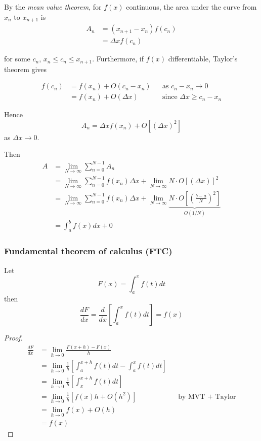 \documentclass{../../template/note}
\begin{document}
    

    By the \emph{mean value theorem}, for \(f(x)\) continuous, the area under the curve from \(x_n\) to \(x_{n+1}\) is
    \begin{align*}
        A_n &= (x_{n+1}-x_n)f(c_n) \\
        &= \Delta x f(c_n)
    \end{align*}
    
    for some \(c_n\), \(x_n \leq c_n \leq x_{n+1}\). Furthermore, if \(f(x)\) differentiable, Taylor's theorem gives

    \begin{align*}
        f(c_n) &= f(x_n) + O(c_n-x_n) && \text{as } c_n - x_n \to 0 \\
        &= f(x_n) + O(\Delta x) && \text{since } \Delta x \geq c_n - x_n
    \end{align*}
    
    Hence
    \[
        A_n = \Delta x f(x_n) + O[(\Delta x)^2]
    \]
    as \(\Delta x \to 0\).
    
    Then
    \begin{align*}
        A &= \lim_{N \to \infty} \sum_{n=0}^{N-1} A_n \\
        &= \lim_{N \to \infty} \sum_{n=0}^{N-1} f(x_n) \Delta x + \lim_{N \to \infty} N \cdot O[(\Delta x)]^2 \\
        &= \lim_{N \to \infty} \sum_{n=0}^{N-1} f(x_n) \Delta x + \lim_{N \to \infty}  \underbrace{N \cdot O\left[\left(\frac{b-a}{N}\right)^2\right]}_{O(1/N)} \\
        &= \int_a^b f(x) dx + 0
    \end{align*}
    
    \subsubsection{Fundamental theorem of calculus (FTC)}
    
    \begin{theorem}[FTC]
        Let
        \[
            F(x) = \int_a^x f(t) dt
        \]
        then
        \[
            \frac{dF}{dx} = \frac{d}{dx} \left[\int_a^x f(t) dt\right] = f(x)
        \]
    \end{theorem}

    \begin{proof}
        \begin{align*}
            \frac{dF}{dx} &= \lim_{h \to 0} \frac {F(x+h)-F(x)} h \\
            &= \lim_{h \to 0} \frac 1 h \left[\int_a^{x+h} f(t) dt-\int_a^x f(t) dt\right] \\
            &= \lim_{h \to 0} \frac 1 h \left[\int_x^{x+h} f(t) dt\right] \\
            &= \lim_{h \to 0} \frac 1 h \left[f(x)h + O(h^2)\right] && \text{by MVT + Taylor} \\
            &= \lim_{h \to 0} f(x) + O(h) \\
            &= f(x)
        \end{align*}
    \end{proof}
    
\end{document}
